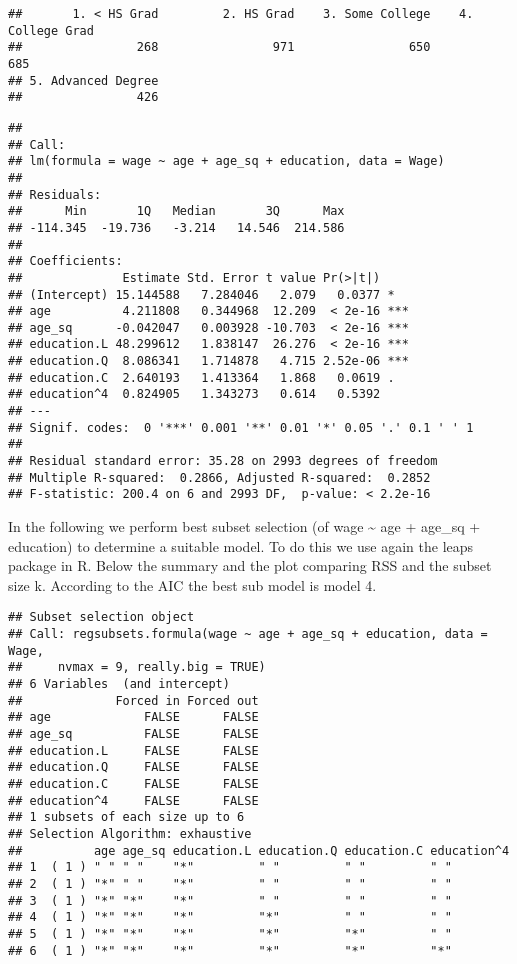 \documentclass[
]{article}
\begin{document}
\begin{verbatim}
##       1. < HS Grad         2. HS Grad    3. Some College    4. College Grad 
##                268                971                650                685 
## 5. Advanced Degree 
##                426
\end{verbatim}

\begin{verbatim}
## 
## Call:
## lm(formula = wage ~ age + age_sq + education, data = Wage)
## 
## Residuals:
##      Min       1Q   Median       3Q      Max 
## -114.345  -19.736   -3.214   14.546  214.586 
## 
## Coefficients:
##              Estimate Std. Error t value Pr(>|t|)    
## (Intercept) 15.144588   7.284046   2.079   0.0377 *  
## age          4.211808   0.344968  12.209  < 2e-16 ***
## age_sq      -0.042047   0.003928 -10.703  < 2e-16 ***
## education.L 48.299612   1.838147  26.276  < 2e-16 ***
## education.Q  8.086341   1.714878   4.715 2.52e-06 ***
## education.C  2.640193   1.413364   1.868   0.0619 .  
## education^4  0.824905   1.343273   0.614   0.5392    
## ---
## Signif. codes:  0 '***' 0.001 '**' 0.01 '*' 0.05 '.' 0.1 ' ' 1
## 
## Residual standard error: 35.28 on 2993 degrees of freedom
## Multiple R-squared:  0.2866, Adjusted R-squared:  0.2852 
## F-statistic: 200.4 on 6 and 2993 DF,  p-value: < 2.2e-16
\end{verbatim}

In the following we perform best subset selection (of wage
\textasciitilde{} age + age\_sq + education) to determine a suitable
model. To do this we use again the leaps package in R. Below the summary
and the plot comparing RSS and the subset size k. According to the AIC
the best sub model is model 4.

\begin{verbatim}
## Subset selection object
## Call: regsubsets.formula(wage ~ age + age_sq + education, data = Wage, 
##     nvmax = 9, really.big = TRUE)
## 6 Variables  (and intercept)
##             Forced in Forced out
## age             FALSE      FALSE
## age_sq          FALSE      FALSE
## education.L     FALSE      FALSE
## education.Q     FALSE      FALSE
## education.C     FALSE      FALSE
## education^4     FALSE      FALSE
## 1 subsets of each size up to 6
## Selection Algorithm: exhaustive
##          age age_sq education.L education.Q education.C education^4
## 1  ( 1 ) " " " "    "*"         " "         " "         " "        
## 2  ( 1 ) "*" " "    "*"         " "         " "         " "        
## 3  ( 1 ) "*" "*"    "*"         " "         " "         " "        
## 4  ( 1 ) "*" "*"    "*"         "*"         " "         " "        
## 5  ( 1 ) "*" "*"    "*"         "*"         "*"         " "        
## 6  ( 1 ) "*" "*"    "*"         "*"         "*"         "*"
\end{verbatim}
\end{document}
